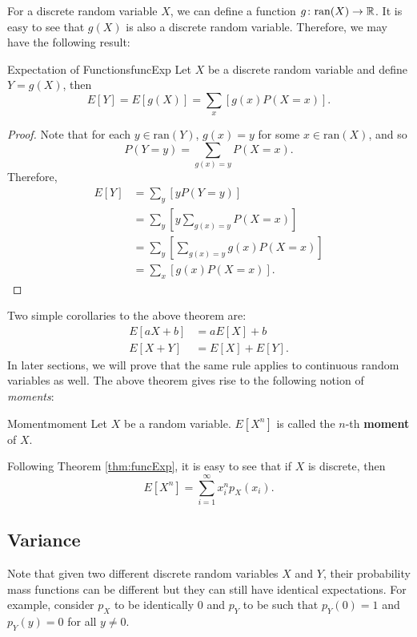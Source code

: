 \documentclass[math]{amznotes}
\theoremstyle{remark}
\begin{document}
For a discrete random variable $X$, we can define a function $g \colon \mathrm{ran}(X) \to \mathbb{R}$. It is easy to see that $g(X)$ is also a discrete random variable. Therefore, we may have the following result:
\begin{thmbox}{Expectation of Functions}{funcExp}
    Let $X$ be a discrete random variable and define $Y = g(X)$, then
    \begin{equation*}
        E[Y] = E[g(X)] = \sum_{x}\left[g(x)P(X = x)\right].
    \end{equation*}
    \tcblower
    \begin{proof}
        Note that for each $y \in \mathrm{ran}(Y)$, $g(x) = y$ for some $x \in \mathrm{ran}(X)$, and so
        \begin{equation*}
            P(Y = y) = \sum_{g(x) = y}P(X = x).
        \end{equation*}
        Therefore,
        \begin{align*}
            E[Y] & = \sum_{y}\left[yP(Y = y)\right] \\
            & = \sum_{y}\left[y\!\sum_{g(x) = y}\!P(X = x)\right] \\
            & = \sum_{y}\left[\sum_{g(x) = y}\!g(x)P(X = x)\right] \\
            & = \sum_{x}\left[g(x)P(X = x)\right].
        \end{align*}
    \end{proof}
\end{thmbox}
Two simple corollaries to the above theorem are:
\begin{align*}
    E[aX + b] & = aE[X] + b \\
    E[X + Y] & = E[X] + E[Y].
\end{align*}
In later sections, we will prove that the same rule applies to continuous random variables as well. The above theorem gives rise to the following notion of \textit{moments}:
\begin{dfnbox}{Moment}{moment}
    Let $X$ be a random variable. $E[X^n]$ is called the $n$-th {\color{red} \textbf{moment}} of $X$.
\end{dfnbox}
Following Theorem \ref{thm:funcExp}, it is easy to see that if $X$ is discrete, then
\begin{equation*}
    E[X^n] = \sum_{i = 1}^{\infty}x_i^np_X(x_i).
\end{equation*}

\subsection{Variance}
Note that given two different discrete random variables $X$ and $Y$, their probability mass functions can be different but they can still have identical expectations. For example, consider $p_X$ to be identically $0$ and $p_Y$ to be such that $p_Y(0) = 1$ and $p_Y(y) = 0$ for all $y \neq 0$.
\end{document}
